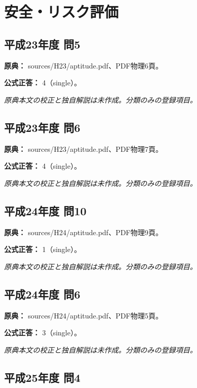 \section{安全・リスク評価}

\subsection{平成23年度 問5}
\label{q:h23-reg-apt-05}

\noindent\textbf{原典：} sources/H23/aptitude.pdf、PDF物理6頁。

\textbf{公式正答：} 4（single）。

\par\textit{原典本文の校正と独自解説は未作成。分類のみの登録項目。}

\subsection{平成23年度 問6}
\label{q:h23-reg-apt-06}

\noindent\textbf{原典：} sources/H23/aptitude.pdf、PDF物理7頁。

\textbf{公式正答：} 4（single）。

\par\textit{原典本文の校正と独自解説は未作成。分類のみの登録項目。}

\subsection{平成24年度 問10}
\label{q:h24-reg-apt-10}

\noindent\textbf{原典：} sources/H24/aptitude.pdf、PDF物理9頁。

\textbf{公式正答：} 1（single）。

\par\textit{原典本文の校正と独自解説は未作成。分類のみの登録項目。}

\subsection{平成24年度 問6}
\label{q:h24-reg-apt-06}

\noindent\textbf{原典：} sources/H24/aptitude.pdf、PDF物理5頁。

\textbf{公式正答：} 3（single）。

\par\textit{原典本文の校正と独自解説は未作成。分類のみの登録項目。}

\subsection{平成25年度 問4}
\label{q:h25-reg-apt-04}

